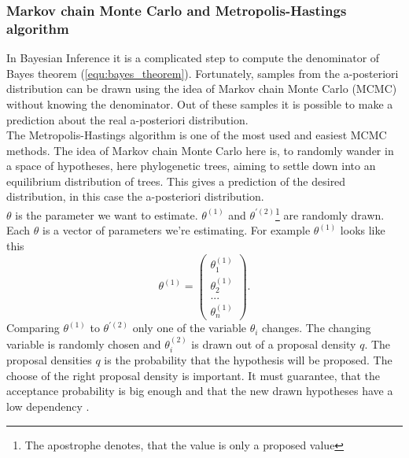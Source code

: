 \documentclass[12pt]{article} %
\begin{document}
	
	
	
	
	
	
	
	\subsubsection{Markov chain Monte Carlo and Metropolis-Hastings algorithm} 
	In Bayesian Inference it is a complicated step to compute the denominator of Bayes theorem (\ref{equ:bayes_theorem}). Fortunately, samples from the a-posteriori distribution can be drawn using the idea of Markov chain Monte Carlo (MCMC) without knowing the denominator. Out of these samples it is possible to make a prediction about the real a-posteriori distribution.\\
	
	The Metropolis-Hastings algorithm is one of the most used and easiest MCMC methods. The idea of Markov chain Monte Carlo here is, to randomly wander in a space of hypotheses, here phylogenetic trees, aiming to settle down into an equilibrium distribution of trees. This gives a prediction of the desired distribution, in this case the a-posteriori distribution. \\
	
	$\theta$ is the parameter we want to estimate. $\theta^{(1)}$ and $\theta^{'(2)}$\footnote{The apostrophe denotes, that the value is only a proposed value} are randomly drawn. Each $\theta$ is a vector of parameters we're estimating. For example $\theta^{(1)}$ looks like this
	\[\theta^{(1)}=\left(\begin{array}{c}\theta^{(1)}_{1}\\\theta^{(1)}_{2}\\...\\\theta^{(1)}_{n}\end{array} \right).\]
	Comparing $\theta^{(1)}$ to $\theta^{'(2)}$ only one of the variable $\theta_{i}$ changes. The changing variable is randomly chosen and  $\theta^{(2)}_{i}$ is drawn out of a proposal density $q$.	The proposal densities $q$ is the probability that the hypothesis will be proposed. The choose of the right proposal density is important. It must guarantee, that the acceptance probability is big enough and that the new drawn hypotheses have a low dependency \cite{fahrmeir2009}.\\
	
\end{document}
